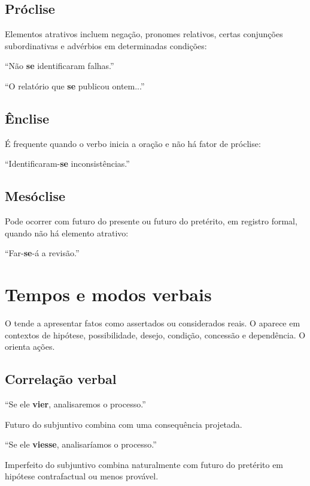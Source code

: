 \subsection{Próclise}

Elementos atrativos incluem negação, pronomes relativos, certas conjunções subordinativas e advérbios em determinadas condições:

``Não \textbf{se} identificaram falhas.''

``O relatório que \textbf{se} publicou ontem...''

\subsection{Ênclise}

É frequente quando o verbo inicia a oração e não há fator de próclise:

``Identificaram-\textbf{se} inconsistências.''

\subsection{Mesóclise}

Pode ocorrer com futuro do presente ou futuro do pretérito, em registro formal, quando não há elemento atrativo:

``Far-\textbf{se}-á a revisão.''

\section{Tempos e modos verbais}

O  tende a apresentar fatos como assertados ou considerados reais. O  aparece em contextos de hipótese, possibilidade, desejo, condição, concessão e dependência. O  orienta ações.

\subsection{Correlação verbal}

``Se ele \textbf{vier}, analisaremos o processo.''

Futuro do subjuntivo combina com uma consequência projetada.

``Se ele \textbf{viesse}, analisaríamos o processo.''

Imperfeito do subjuntivo combina naturalmente com futuro do pretérito em hipótese contrafactual ou menos provável.

